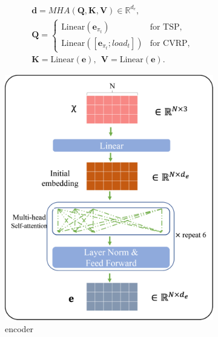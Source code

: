 \documentclass{article}
\begin{document}
\begin{align}
    & \mathbf{d} = MHA(\boldsymbol{Q}, \boldsymbol{K}, \boldsymbol{V}) \in \mathbb{R}^{d_e}, \\
    & \boldsymbol{Q} =
    \begin{cases}
         \mbox{Linear}(\mathbf{e}_{\pi_t}) & \text{for TSP}, \\
         \mbox{Linear}([\mathbf{e}_{\pi_t}; load_t]) & \text{for CVRP},
    \end{cases} \\
    & \boldsymbol{K} = \mbox{Linear}(\mathbf{e}),~~ \boldsymbol{V} = \mbox{Linear}(\mathbf{e}).
\end{align}

\begin{figure}
    \begin{center}
        \begin{subfigure}[b]{0.45\linewidth}
        \centering
         \includegraphics[width=\linewidth]{figures/encoder.png}
         \caption{encoder}
         \label{fig:nn-encoder}
        \end{subfigure}
        \hfill
        \begin{subfigure}[b]{0.45\linewidth}

\end{subfigure}
\end{center}
\end{figure}
\end{document}
